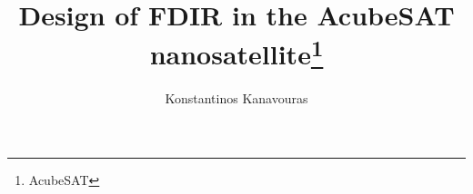 \documentclass[a4paper,nobib,final]{tufte-book}
\title{Design of FDIR in the AcubeSAT nanosatellite\thanks{AcubeSAT}}
\author[Konstantinos Kanavouras]{Konstantinos Kanavouras}
\begin{document}
	



\makeatletter
\renewcommand{\maketitle}{%
	\newpage
	\global\@topnum\z@%
	\begingroup
	\setlength{\parindent}{0pt}%
	\setlength{\parskip}{4pt}%
	\let\@@title\@empty
	\let\@@author\@empty
	\let\@@date\@empty
	\thispagestyle{empty}
	\begin{fullwidth}
		\vfill
		\begin{center}
			\href{https://www.auth.gr/}{\texttt{[image: auth\_logo\_text]}}\par
			\vspace{1cm}
			\LARGE\textsc{Diploma Thesis}\par
			\vspace{6ex}
			\hrule
			\vspace{4ex}
			\Huge\textbf{Design of Fault Detection, Isolation and Recovery}\\[1ex]
			\LARGE\textbf{in the}\\
			\Huge\textbf{AcubeSAT NanoSatellite}\par
			\vspace{2.7ex}
			\hrule

			\vspace{6ex}

			\Large
			\begin{tabular}{ll}
				\emph{Author:} & \href{https://github.com/kongr45gpen}{Konstantinos \textsc{Kanavouras} \normalsize (\fontfamily{pplx}\selectfont 8824)}
				\\[1.5ex]
				\emph{Supervisor:} & \href{http://ee.auth.gr/en/school/faculty-staff/electronics-computers-department/hatzopoulos-alkiviadis/}{Prof. Alkiviadis \textsc{Hatzopoulos}}
			\end{tabular}

			\vspace{6ex}

			\large \textit{A thesis submitted in fulfillment of the requirements\\ for the diploma in Electrical \& Computer Engineering}\\[0.3cm] %
			\textit{in the}\\[0.4cm]
			\href{https://www.eng.auth.gr/en/home.html}{Faculty of Engineering}
			\\
			\href{https://ee.auth.gr/en/}{Electrical \& Computer Engineering Department}
			\\[1cm] %


\end{center}
\end{fullwidth}}
\end{document}
